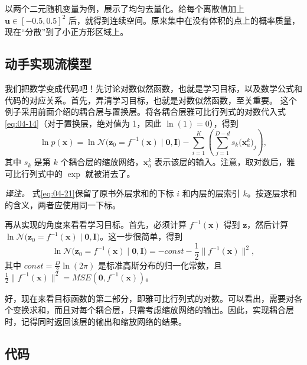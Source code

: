 以两个二元随机变量为例，展示了均匀去量化。给每个离散值加上 $\mathbf{u}\in[-0.5,0.5]^2$ 后，就得到连续空间。原来集中在没有体积的点上的概率质量，现在“分散”到了小正方形区域上。


\subsection{动手实现流模型}

我们把数学变成代码吧！先讨论对数似然函数，也就是学习目标，以及数学公式和代码的对应关系。首先，弄清学习目标，也就是对数似然函数，至关重要。
这个例子采用前面介绍的耦合层与置换层。将各耦合层雅可比行列式的对数代入式\eqref{eq:04-14}（对于置换层，绝对值为 1，因此 $\ln(1)=0$），得到
\begin{equation}
\ln p(\mathbf{x})=\ln\mathcal{N}\bigl(\mathbf{z}_0=f^{-1}(\mathbf{x})\mid\mathbf{0},\mathbf{I}\bigr)
-\sum_{i=1}^K\left(\sum_{j=1}^{D-d}s_k\bigl(\mathbf{x}_a^k\bigr)_j\right),
\tag{4.21}\label{eq:04-21}
\end{equation}
其中 $s_k$ 是第 $k$ 个耦合层的缩放网络，$\mathbf{x}_a^k$ 表示该层的输入。注意，取对数后，雅可比行列式中的 $\exp$ 就被消去了。

\emph{译注。} 式\eqref{eq:04-21}保留了原书外层求和的下标 $i$ 和内层的层索引 $k$。按逐层求和的含义，两者应使用同一下标。

再从实现的角度来看看学习目标。首先，必须计算 $f^{-1}(\mathbf{x})$ 得到 $\mathbf{z}$，然后计算 $\ln\mathcal{N}\bigl(\mathbf{z}_0=f^{-1}(\mathbf{x})\mid\mathbf{0},\mathbf{I}\bigr)$。这一步很简单，得到
\begin{equation}
\ln\mathcal{N}\bigl(\mathbf{z}_0=f^{-1}(\mathbf{x})\mid\mathbf{0},\mathbf{I}\bigr)
=-\mathit{const}-\frac{1}{2}\bigl\|f^{-1}(\mathbf{x})\bigr\|^2,
\tag{4.22}\label{eq:04-22}
\end{equation}
其中 $\mathit{const}=\frac{D}{2}\ln(2\pi)$ 是标准高斯分布的归一化常数，且 $\frac{1}{2}\bigl\|f^{-1}(\mathbf{x})\bigr\|^2=\mathit{MSE}(\mathbf{0},f^{-1}(\mathbf{x}))$。

好，现在来看目标函数的第二部分，即雅可比行列式的对数。可以看出，需要对各个变换求和，而且对每个耦合层，只需考虑缩放网络的输出。因此，实现耦合层时，记得同时返回该层的输出和缩放网络的结果。

\subsection{代码}

